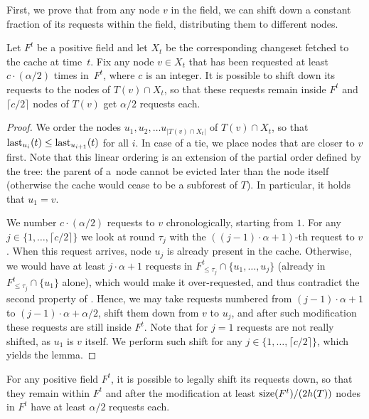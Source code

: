 First, we prove that from any node $v$ in the field, we can shift down a
constant fraction of its requests within the field, distributing them to
different nodes.

\begin{lemma}
\label{lem:downshift}
Let $F^t$ be a positive field and let $X_t$ be the corresponding changeset
fetched to the cache at time~$t$. Fix any node $v \in X_t$ that has been
requested at least $c \cdot (\alpha / 2)$ times in~$F^t$, where $c$ is an
integer. It is possible to shift down its requests to the nodes of $T(v) \cap
X_t$, so that these requests remain inside $F^t$ and $\lceil c / 2 \rceil$
nodes of $T(v)$ get $\alpha / 2$ requests each.
\end{lemma}

\begin{proof}
We order the nodes $u_1, u_2, \ldots u_{|T(v) \cap X_t|}$ of $T(v) \cap X_t$,
so that $\textrm{last}_{u_i}(t) \leq \textrm{last}_{u_{i+1}}(t)$ for all $i$. In case of a
tie, we place nodes that are closer to $v$ first. Note that this linear
ordering is an extension of the partial order defined by the tree: the parent
of a~node cannot be evicted later than the node itself (otherwise the cache
would cease to be a subforest of $T$). In particular, it holds that $u_1 = v$.

We number $c \cdot (\alpha / 2)$ requests to $v$ chronologically, starting
from $1$. For any $j \in \{1, \ldots, \lceil c/2 \rceil \}$ we look at round
$\tau_j$ with the $((j-1) \cdot \alpha + 1)$-th request to $v$. When this
request arrives, node $u_j$ is already present in the cache. Otherwise, we
would have at least \mbox{$j \cdot \alpha + 1$} requests in $F^t_{\leq
{\tau_j}} \cap \{u_1, \ldots, u_j\}$ (already in $F^t_{\leq {\tau_j}}
\cap \{u_1\}$ alone), which would make it over-requested, and thus contradict
the second property of . Hence, we may
take requests numbered from $(j-1) \cdot \alpha + 1$ to $(j-1) \cdot \alpha +
\alpha/2$, shift them down from $v$ to $u_j$, and after such modification
these requests are still inside $F^t$. Note that for $j = 1$ requests are not
really shifted, as $u_1$ is $v$ itself. We perform such shift for any $j \in
\{1, \ldots, \lceil c/2 \rceil \}$, which yields the lemma.
\end{proof}
  
\begin{lemma}
\label{lem:crucial_lemma_pos}
For any positive field $F^t$, it is possible to legally shift its requests
down, so that they remain within $F^t$ and after the modification at least
$\textrm{size}(F^t)/(2 h(T))$ nodes in $F^t$ have at least $\alpha/2$ requests each.
\end{lemma}

